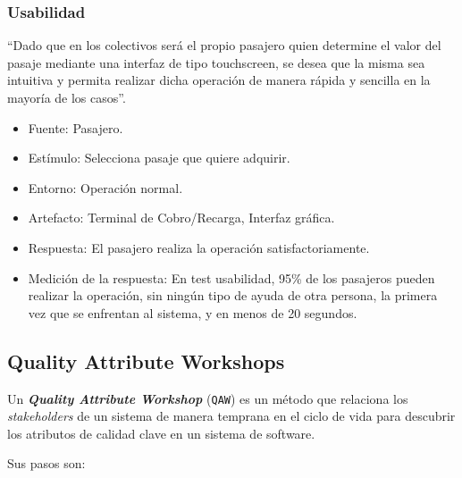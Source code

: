 \documentclass[]{article}
\begin{document}
\subsubsection{Usabilidad}
``Dado que en los colectivos será el propio pasajero quien determine el valor del pasaje mediante una interfaz de tipo touchscreen, se desea que la misma sea intuitiva y permita realizar dicha operación de manera rápida y sencilla en la mayoría de los casos''.

\begin{itemize}
	\item Fuente: Pasajero.
	\item Estímulo: Selecciona pasaje que quiere adquirir.
	\item Entorno: Operación normal.
	\item Artefacto: Terminal de Cobro/Recarga, Interfaz gráfica.
	\item Respuesta: El pasajero realiza la operación satisfactoriamente.
	\item Medición de la respuesta: En test usabilidad, 95\% de los pasajeros pueden realizar la operación, sin ningún tipo de ayuda de otra persona, la primera vez que se enfrentan al sistema, y en menos de 20 segundos.
\end{itemize}


\subsection{Quality Attribute Workshops}
Un \emph{\textbf{Quality Attribute Workshop}} (\texttt{QAW}) es un método que relaciona los \emph{stakeholders} de un sistema de manera temprana en el ciclo de vida para descubrir los atributos de calidad clave en un sistema de software.

Sus pasos son:
\end{document}
